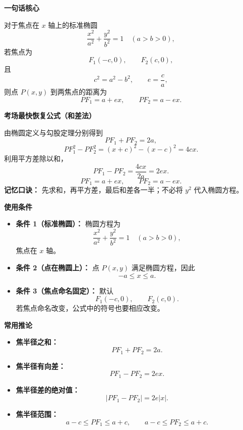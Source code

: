 \begin{summarybox}
	\textbf{\textcolor{CSummary}{一句话核心}}

	对于焦点在 $x$ 轴上的标准椭圆
	\[
		\frac{x^2}{a^2}+\frac{y^2}{b^2}=1\quad (a>b>0),
	\]
	若焦点为
	\[
		F_1(-c,0),\qquad F_2(c,0),
	\]
	且
	\[
		c^2=a^2-b^2,\qquad e=\frac{c}{a},
	\]
	则点 $P(x,y)$ 到两焦点的距离为
	\[
		PF_1=a+ex,\qquad PF_2=a-ex.
	\]

	\medskip
	\textbf{\textcolor{CSummary}{考场最快恢复公式（和差法）}}

	由椭圆定义与勾股定理分别得到
	\[
		PF_1+PF_2=2a,
	\]
	\[
		PF_1^2-PF_2^2=(x+c)^2-(x-c)^2=4cx.
	\]
	利用平方差除以和，
	\[
		PF_1-PF_2=\frac{4cx}{2a}=2ex.
	\]
	\[
		\boxed{PF_1=a+ex,\qquad PF_2=a-ex.}
	\]
	\textbf{记忆口诀：} 先求和，再平方差，最后和差各一半；不必将 $y^2$ 代入椭圆方程。

	\medskip
	\textbf{\textcolor{CSummary}{使用条件}}
	\begin{itemize}[leftmargin=*, itemsep=0.5em, topsep=0.4em]
		\item \textbf{条件 1（标准椭圆）：} 椭圆方程为
		      \[
			      \frac{x^2}{a^2}+\frac{y^2}{b^2}=1\quad (a>b>0),
		      \]
		      焦点在 $x$ 轴。
		\item \textbf{条件 2（点在椭圆上）：} 点 $P(x,y)$ 满足椭圆方程，因此
		      \[
			      -a\le x\le a.
		      \]
		\item \textbf{条件 3（焦点命名固定）：} 默认
		      \[
			      F_1(-c,0),\qquad F_2(c,0).
		      \]
		      若焦点命名改变，公式中的符号也要相应改变。
	\end{itemize}

	\medskip
	\textbf{\textcolor{CSummary}{常用推论}}
	\begin{itemize}[leftmargin=*, itemsep=0.5em, topsep=0.4em]
		\item \textbf{焦半径之和：}
		      \[
			      PF_1+PF_2=2a.
		      \]
		\item \textbf{焦半径有向差：}
		      \[
			      PF_1-PF_2=2ex.
		      \]
		\item \textbf{焦半径差的绝对值：}
		      \[
			      |PF_1-PF_2|=2e|x|.
		      \]
		\item \textbf{焦半径范围：}
		      \[
			      a-c\le PF_1\le a+c,\qquad a-c\le PF_2\le a+c.
		      \]
	\end{itemize}


\end{summarybox}
